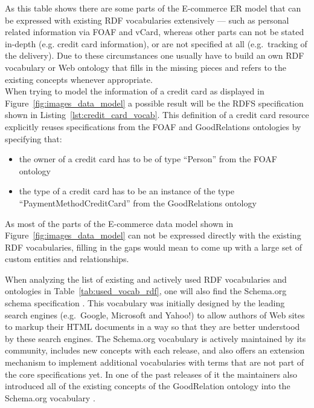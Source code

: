 As this table shows there are some parts of the \gls{E-commerce} \gls{ER} model that can be expressed with existing \gls{RDF} vocabularies extensively --- such as personal related information via \gls{FOAF} and \gls{vCard}, whereas other parts can not be stated in-depth (e.g. credit card information), or are not specified at all (e.g.\ tracking of the delivery). Due to these circumstances one usually have to build an own \gls{RDF} vocabulary or Web ontology that fills in the missing pieces and refers to the existing concepts whenever appropriate.\\

When trying to model the information of a credit card as displayed in Figure~\ref{fig:images_data_model} a possible result will be the \gls{RDFS} specification shown in Listing~\ref{lst:credit_card_vocab}. This definition of a credit card resource explicitly reuses specifications from the \gls{FOAF} and GoodRelations ontologies by specifying that: \@

\begin{itemize}
 \item the owner of a credit card has to be of type ``Person'' from the \gls{FOAF} ontology
 \item the type of a credit card has to be an instance of the type ``PaymentMethodCreditCard'' from the GoodRelations ontology
\end{itemize}

As most of the parts of the \gls{E-commerce} data model shown in Figure~\ref{fig:images_data_model} can not be expressed directly with the existing \gls{RDF} vocabularies, filling in the gaps would mean to come up with a large set of custom entities and relationships.


When analyzing the list of existing and actively used \gls{RDF} vocabularies and ontologies in Table~\ref{tab:used_vocab_rdf}, one will also find the Schema.org schema specification \citep{Schema.org}. This vocabulary was initially designed by the leading search engines (e.g.\ Google, Microsoft and Yahoo!) to allow authors of Web sites to markup their \gls{HTML} documents in a way so that they are better understood by these search engines. The Schema.org vocabulary is actively maintained by its community, includes new concepts with each release, and also offers an extension mechanism to implement additional vocabularies with terms that are not part of the core specifications \citep{SchemaExtensions} yet. In one of the past releases of it the maintainers also introduced all of the existing concepts of the GoodRelation ontology into the Schema.org vocabulary \citep{SchemaGoodRelation}. \\

